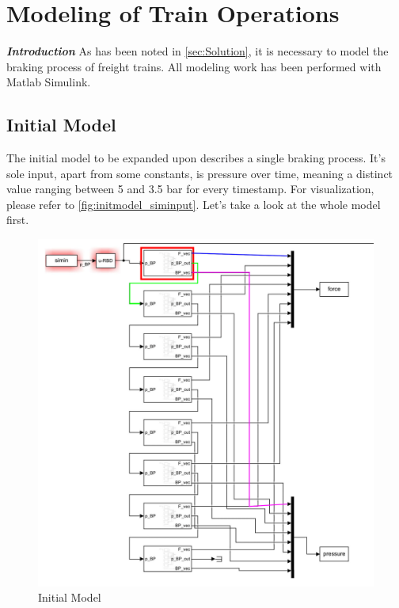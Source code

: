 \chapter{Modeling of Train Operations}
\label{chap:ModelingOfTrainOperations}
\par\noindent
\textit{\textbf{Introduction}} As has been noted in \ref{sec:Solution}, it is necessary to model the braking process of freight trains. All modeling work has been performed with Matlab Simulink. 

\section{Initial Model}
\label{sec:InitialModel}
\par\noindent
The initial model to be expanded upon describes a single braking process. It's sole input, apart from some constants, is pressure over time, meaning a distinct value ranging between 5 and 3.5 bar for every timestamp. For visualization, please refer to \ref{fig:initmodel_siminput}. Let's take a look at the whole model first. 

\begin{figure}[H]
	\centering
	\includegraphics[width=\linewidth]{./pic/initmodel_whole}
	\caption{Initial Model}
	\label{fig:initmodel_whole}
\end{figure}

